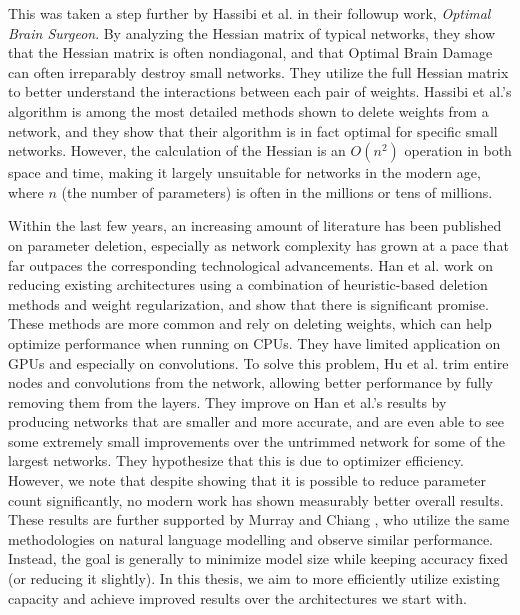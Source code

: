 This was taken a step further by Hassibi et al. \cite{hassibi1993second} in their followup work, \emph{Optimal Brain Surgeon}.
By analyzing the Hessian matrix of typical networks, they show that the Hessian matrix is often nondiagonal, and that Optimal Brain Damage can often irreparably destroy small networks.
They utilize the full Hessian matrix to better understand the interactions between each pair of weights.
Hassibi et al.'s algorithm is among the most detailed methods shown to delete weights from a network, and they show that their algorithm is in fact optimal for specific small networks.
However, the calculation of the Hessian is an $O(n^2)$ operation in both space and time, making it largely unsuitable for networks in the modern age, where $n$ (the number of parameters) is often in the millions or tens of millions.

Within the last few years, an increasing amount of literature has been published on parameter deletion, especially as network complexity has grown at a pace that far outpaces the corresponding technological advancements.
Han et al. \cite{han2015learning} work on reducing existing architectures using a combination of heuristic-based deletion methods and weight regularization, and show that there is significant promise.
These methods are more common and rely on deleting weights, which can help optimize performance when running on CPUs.
They have limited application on GPUs and especially on convolutions.
To solve this problem, Hu et al. \cite{hu2016network} trim entire nodes and convolutions from the network, allowing better performance by fully removing them from the layers.
They improve on Han et al.'s results by producing networks that are smaller and more accurate, and are even able to see some extremely small improvements over the untrimmed network for some of the largest networks.
They hypothesize that this is due to optimizer efficiency.
However, we note that despite showing that it is possible to reduce parameter count significantly, no modern work has shown measurably better overall results.
These results are further supported by Murray and Chiang \cite{murray2015auto}, who utilize the same methodologies on natural language modelling and observe similar performance.
Instead, the goal is generally to minimize model size while keeping accuracy fixed (or reducing it slightly).
In this thesis, we aim to more efficiently utilize existing capacity and achieve improved results over the architectures we start with.

